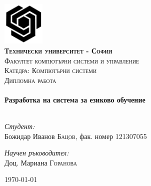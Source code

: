 \begin{titlepage}

\begin{center}


\includegraphics[width=0.15\textwidth]{images/tu-logo.png}\\[1cm]    

\textsc{\LARGE \bfseries Технически университет - София}\\[0.5cm]
\textsc{\Large Факултет компютърни системи и управление}\\[1.0cm]
\textsc{\Large Катедра: Компютърни системи}\\[1.0cm]

\textsc{\Large Дипломна работа}\\[0.5cm]


\HRule \\[0.4cm]
{ \huge \bfseries Разработка на система за езиково обучение}\\[0.4cm]

\HRule \\[1.5cm]

\begin{minipage}{0.4\textwidth}
\begin{flushleft} \large
\emph{Студент:}\\
Божидар Иванов \textsc{Бацов}, фак. номер 121307055
\end{flushleft}
\end{minipage}
\begin{minipage}{0.4\textwidth}
\begin{flushright} \large
\emph{Научен ръководител:} \\
Доц. Мариана \textsc{Горанова}
\end{flushright}
\end{minipage}

\vfill

{\large \today}

\end{center}

\end{titlepage}
